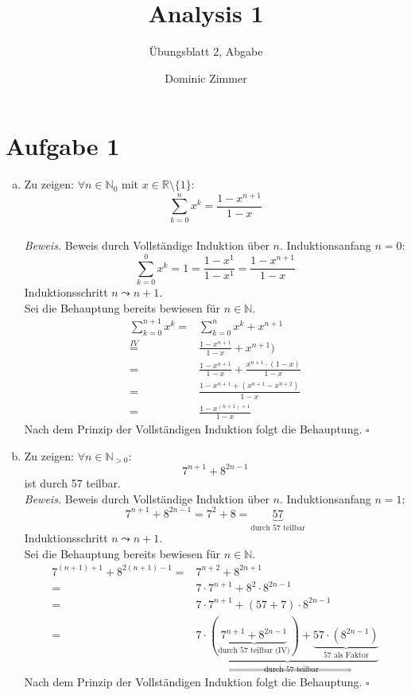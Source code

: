 \documentclass{scrreprt}
\newenvironment{proof}{\emph{\\Beweis.}}{$\square$}
\newcommand{\NN}{\mathbb{N}}
\newcommand{\RR}{\mathbb{R}}
\begin{document}
	\title{Analysis 1}
 	\author{Dominic Zimmer}
 	\subtitle{Übungsblatt 2, Abgabe}
  	\maketitle 


	\section*{Aufgabe 1}
	\begin{samepage}
	\begin{enumerate}[a)]
		\item 
			Zu zeigen: $\forall n \in \NN_0$ mit $x \in \RR \setminus \lbrace 1 \rbrace$:
			\[
				\sum_{k=0}^n x^k = \frac{1 - x^{n + 1}}{1-x}
			\]
			\begin{proof}
				Beweis durch Vollständige Induktion über $n$. Induktionsanfang $n=0$:
				\[
					\sum\limits_{k=0}^0 x^k = 1 = \frac{1-x^{1}}{1-x^{1}} = \frac{1 - x^{n + 1}}{1-x}
				\]
				Induktionsschritt $n \leadsto n+1$.\\
				Sei die Behauptung bereits bewiesen für $n \in \NN$.
				\begin{align*}
					\sum_{k=0}^{n+1} x^k = & \sum_{k=0}^n x^k + x^{n+1}\\
					\overset{IV}{=} &\frac{1 - x^{n + 1}}{1-x} + x^{n+1})\\
					= & \frac{1 - x^{n + 1}}{1-x} + \frac{x^{n+1} \cdot (1-x)}{1-x}\\
					= & \frac{1 - x^{n + 1} + (x^{n+1} - x^{n+2})}{1-x}\\
					= & \frac{1 - x^{(n+1) + 1}}{1-x}
				\end{align*}
				Nach dem Prinzip der Vollständigen Induktion folgt die Behauptung.
			\end{proof}
		\item 
			Zu zeigen: $\forall n \in \NN_{>0}:$
			\[
				7^{n+1} + 8^{2n-1}
			\] 
			ist durch 57 teilbar.
			\begin{proof}
				Beweis durch Vollständige Induktion über $n$. Induktionsanfang $n=1$:
				\[
					7^{n+1} + 8^{2n-1} = 7^{2} + 8 = \underbrace{57}_{\text{durch 57 teilbar}}
				\]
				Induktionsschritt $n \leadsto n+1$.\\
				Sei die Behauptung bereits bewiesen für $n \in \NN$.
				\begin{align*}
					7^{(n+1) +1} + 8^{2(n+1)-1} = & 7^{n+2} + 8^{2n+1}\\
					= &7 \cdot 7^{n+1} + 8^2 \cdot 8^{2n-1}\\
					= &7 \cdot 7^{n+1} + (57+7) \cdot 8^{2n-1}\\
					= &\underbrace{7 \cdot (\underbrace{7^{n+1} + 8^{2n -1}}_{\text{durch 57 teilbar (IV)}}) + \underbrace{57 \cdot (8^{2n-1})}_{\text{57 als Faktor}}}_{\text{$\Rightarrow $durch 57 teilbar}}
				\end{align*}
				Nach dem Prinzip der Vollständigen Induktion folgt die Behauptung.
			\end{proof}
	\end{enumerate}
	\end{samepage}
\end{document}
